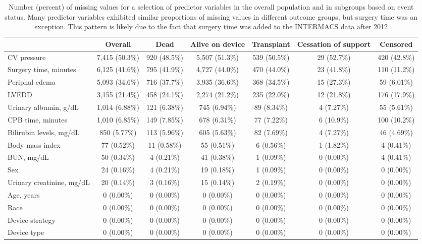\documentclass{article}
\begin{document}
\begin{table} 
 \caption{Number (percent) of missing values for a selection of predictor variables in the overall population and in subgroups based on event status. Many predictor variables exhibited similar proportions of missing values in different outcome groups, but surgery time was an exception. This pattern is likely due to the fact that surgery time was added to the INTERMACS data after 2012} 
\label{tbl_missingness} 
\footnotesize
 
\begin{tabular}{lcccccc}
\toprule
 & Overall & Dead & Alive on device & Transplant & Cessation of support & Censored \\ 
\midrule
CV pressure & 7,415 (50.3\%) & 920 (48.5\%) & 5,507 (51.3\%) & 539 (50.5\%) & 29 (52.7\%) & 420 (42.8\%) \\ 
Surgery time, minutes & 6,125 (41.6\%) & 795 (41.9\%) & 4,727 (44.0\%) & 470 (44.0\%) & 23 (41.8\%) & 110 (11.2\%) \\ 
Periphal edema & 5,093 (34.6\%) & 716 (37.7\%) & 3,935 (36.6\%) & 368 (34.5\%) & 15 (27.3\%) & 59 (6.01\%) \\ 
LVEDD & 3,155 (21.4\%) & 458 (24.1\%) & 2,274 (21.2\%) & 235 (22.0\%) & 12 (21.8\%) & 176 (17.9\%) \\ 
Urinary albumin, g/dL & 1,014 (6.88\%) & 121 (6.38\%) & 745 (6.94\%) & 89 (8.34\%) & 4 (7.27\%) & 55 (5.61\%) \\ 
CPB time, minutes & 1,010 (6.85\%) & 149 (7.85\%) & 678 (6.31\%) & 77 (7.22\%) & 6 (10.9\%) & 100 (10.2\%) \\ 
Bilirubin levels, mg/dL & 850 (5.77\%) & 113 (5.96\%) & 605 (5.63\%) & 82 (7.69\%) & 4 (7.27\%) & 46 (4.69\%) \\ 
Body mass index & 77 (0.52\%) & 11 (0.58\%) & 55 (0.51\%) & 6 (0.56\%) & 1 (1.82\%) & 4 (0.41\%) \\ 
BUN, mg/dL & 50 (0.34\%) & 4 (0.21\%) & 41 (0.38\%) & 1 (0.09\%) & 0 (0.00\%) & 4 (0.41\%) \\ 
Sex & 24 (0.16\%) & 4 (0.21\%) & 19 (0.18\%) & 1 (0.09\%) & 0 (0.00\%) & 0 (0.00\%) \\ 
Urinary creatinine, mg/dL & 20 (0.14\%) & 3 (0.16\%) & 15 (0.14\%) & 2 (0.19\%) & 0 (0.00\%) & 0 (0.00\%) \\ 
Age, years & 0 (0.00\%) & 0 (0.00\%) & 0 (0.00\%) & 0 (0.00\%) & 0 (0.00\%) & 0 (0.00\%) \\ 
Race & 0 (0.00\%) & 0 (0.00\%) & 0 (0.00\%) & 0 (0.00\%) & 0 (0.00\%) & 0 (0.00\%) \\ 
Device strategy & 0 (0.00\%) & 0 (0.00\%) & 0 (0.00\%) & 0 (0.00\%) & 0 (0.00\%) & 0 (0.00\%) \\ 
Device type & 0 (0.00\%) & 0 (0.00\%) & 0 (0.00\%) & 0 (0.00\%) & 0 (0.00\%) & 0 (0.00\%) \\ 
\bottomrule
\end{tabular} 
 \end{table}
\end{document}
